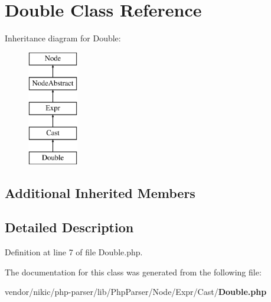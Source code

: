 \section{Double Class Reference}
\label{class_php_parser_1_1_node_1_1_expr_1_1_cast_1_1_double}
Inheritance diagram for Double\+:\begin{figure}[H]
\begin{center}
\leavevmode
\includegraphics[height=5.000000cm]{class_php_parser_1_1_node_1_1_expr_1_1_cast_1_1_double}
\end{center}
\end{figure}
\subsection*{Additional Inherited Members}


\subsection{Detailed Description}


Definition at line 7 of file Double.\+php.



The documentation for this class was generated from the following file\+:\begin{DoxyCompactItemize}
\item 
vendor/nikic/php-\/parser/lib/\+Php\+Parser/\+Node/\+Expr/\+Cast/{\bf Double.\+php}\end{DoxyCompactItemize}

